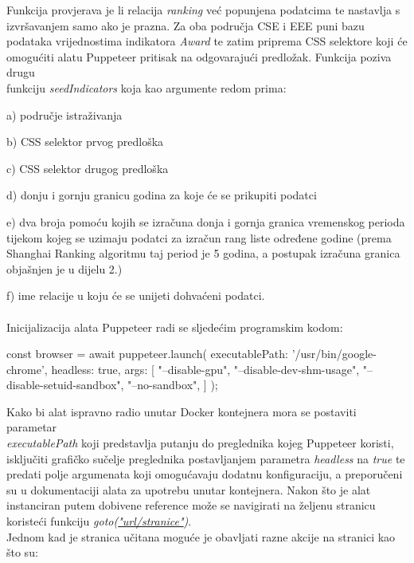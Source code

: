 \documentclass[times, utf8, zavrsni]{fer}
\begin{document}
Funkcija provjerava je li relacija \emph{ranking} već popunjena podatcima te nastavlja s \\izvršavanjem samo ako je prazna. 
Za oba područja CSE i EEE puni bazu podataka vrijednostima indikatora \emph{Award} te zatim priprema CSS selektore koji će omogućiti alatu 
Puppeteer pritisak na odgovarajući predložak. Funkcija poziva drugu \\funkciju \emph{seedIndicators} koja kao argumente redom prima:

    a) područje istraživanja
    
    b) CSS selektor prvog predloška 

    c) CSS selektor drugog predloška
    
    d) donju i gornju granicu godina za koje će se prikupiti podatci
    
    e) dva broja pomoću kojih se izračuna donja i gornja granica vremenskog perioda tijekom kojeg se uzimaju podatci za izračun rang liste određene godine
        (prema \\Shanghai Ranking algoritmu taj period je 5 godina, a postupak izračuna granica objašnjen je u dijelu 2.)
      
    f) ime relacije u koju će se unijeti dohvaćeni podatci.
\\\\Inicijalizacija alata Puppeteer radi se sljedećim programskim kodom:
\begin{verbnobox}[\fontsize{10pt}{10pt}\selectfont] 
const browser = await puppeteer.launch({
    executablePath: '/usr/bin/google-chrome',
    headless: true,
    args: [
        "--disable-gpu",
        "--disable-dev-shm-usage",
        "--disable-setuid-sandbox",
        "--no-sandbox",
        ]
});
\end{verbnobox}  
Kako bi alat ispravno radio unutar Docker kontejnera mora se postaviti parametar \\\emph{executablePath} koji predstavlja putanju 
do preglednika kojeg Puppeteer koristi, isključiti grafičko sučelje preglednika postavljanjem parametra \emph{headless} na \emph{true} te predati 
polje argumenata koji omogućavaju dodatnu konfiguraciju, a preporučeni su u dokumentaciji alata za upotrebu unutar kontejnera.
Nakon što je alat instanciran putem dobivene reference može se navigirati na željenu stranicu koristeći funkciju \emph{goto(\url{"url/stranice"})}.
\\Jednom kad je stranica učitana moguće je obavljati razne akcije na stranici kao što su:
\end{document}
